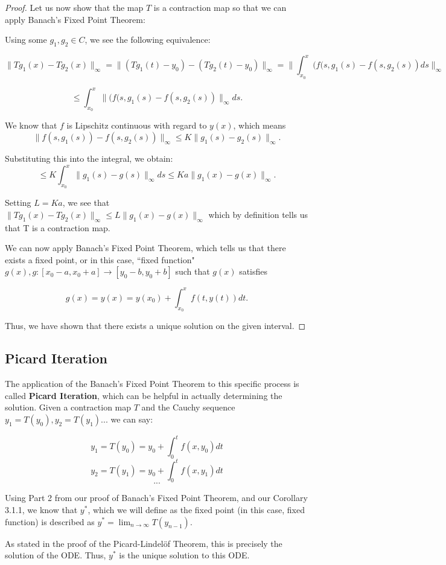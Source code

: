 \documentclass{article}
\theoremstyle{remark}
\begin{document}
\begin{proof}
Let us now show that the map $T$ is a contraction map so that we can apply Banach's Fixed Point Theorem:

Using some $g_1, g_2 \in C$, we see the following equivalence:


$$ \|Tg_1(x) -Tg_2(x)\|_\infty = \|(Tg_1(t)-y_0) - (Tg_2(t) - y_0)\|_\infty = \|\int_{x_0}^x (f(s, g_1(s) - f(s, g_2(s))ds\|_{\infty}$$

$$ \leq \int_{x_0}^x \|(f(s, g_1(s) - f(s, g_2(s))\|_\infty ds.$$

We know that $f$ is Lipschitz continuous with regard to $y(x)$, which means 
$$\|f(s, g_1(s)) - f(s, g_2(s))\|_{\infty} \leq K\|g_1(s) - g_2(s) \|_{\infty}.$$

Substituting this into the integral, we obtain:
$$ \leq K \int_{x_0}^x \|g_1(s) - g(s)\|_\infty ds 
\leq Ka\|g_1(x) - g(x)\|_\infty.$$

Setting $L = Ka$, we see that $\|Tg_1(x) -Tg_2(x)\|_\infty \leq L\|g_1(x) - g(x)\|_\infty$ which by definition tells us that T is a contraction map.

We can now apply Banach's Fixed Point Theorem, which tells us that there exists a fixed point, or in this case, ``fixed function" $g(x), g: [x_0 -a, x_0+a] \to [y_0 -b, y_0 +b] $ such that $g(x)$ satisfies

$$g(x) = y(x) = y(x_0) + \int_{x_0}^xf(t, y(t))dt.$$

Thus, we have shown that there exists a unique solution on the given interval.


\end{proof}

\subsection{Picard Iteration}
The application of the Banach's Fixed Point Theorem to this specific process is called \textbf{Picard Iteration}, which can be helpful in actually determining the solution. Given a contraction map $T$ and the Cauchy sequence $y_1 = T(y_0), y_2 = T(y_1)...$ we can say:

$$y_1 = T(y_0) = y_0 + \int_0^t f(x, y_0)dt$$
$$y_2 = T(y_1) = y_0 + \int_0^t f(x, y_1)dt$$
$$...$$

Using Part 2 from our proof of Banach's Fixed Point Theorem, and our Corollary 3.1.1, we know that $y^*$, which we will define as the fixed point (in this case, fixed function) is described as
$y^* = \lim_{n \to \infty}T(y_{n-1}).$

As stated in the proof of the Picard-Lindel\"{o}f Theorem, this is precisely the solution of the ODE. Thus, $y^*$ is the unique solution to this ODE.
\end{document}
